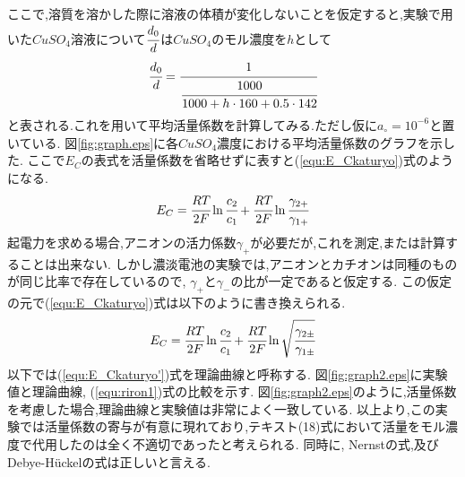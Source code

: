 ここで,溶質を溶かした際に溶液の体積が変化しないことを仮定すると,実験で用いた$CuSO_4$溶液について$\cfrac{d_0}{d}$は$CuSO_4$のモル濃度を$h$として
\begin{equation}
  \label{equ:h}
  \cfrac{d_0}{d}=\cfrac{1}{\cfrac{1000}{1000+h\cdot160+0.5\cdot142}}
\end{equation}
と表される.これを用いて平均活量係数を計算してみる.ただし仮に$a_{\circ}=10^{-6}$と置いている.
図\ref{fig:graph.eps}に各$CuSO_4$濃度における平均活量係数のグラフを示した.
ここで$E_C$の表式を活量係数を省略せずに表すと(\ref{equ:E_Ckaturyo})式のようになる.
\begin{equation}
  \label{equ:E_Ckaturyo}
  E_C=\cfrac{RT}{2F}\ln \cfrac{c_2}{c_1} + \cfrac{RT}{2F}\ln \cfrac{\gamma_{2+}}{\gamma_{1+}}
\end{equation}
起電力を求める場合,アニオンの活力係数$\gamma_+$が必要だが,これを測定,または計算することは出来ない\cite{kakiuchi2016}.
しかし濃淡電池の実験では,アニオンとカチオンは同種のものが同じ比率で存在しているので, $\gamma_{+}$と$\gamma_{-}$の比が一定であると仮定する.
この仮定の元で(\ref{equ:E_Ckaturyo})式は以下のように書き換えられる.
\begin{equation}
  \label{equ:E_Ckaturyo'}
  E_C=\cfrac{RT}{2F}\ln \cfrac{c_2}{c_1} + \cfrac{RT}{2F}\ln \sqrt{\cfrac{\gamma_{2\pm}}{\gamma_{1\pm}}}
\end{equation}
以下では(\ref{equ:E_Ckaturyo'})式を理論曲線と呼称する.
図\ref{fig:graph2.eps}に実験値と理論曲線, (\ref{equ:riron1})式の比較を示す.
図\ref{fig:graph2.eps}のように,活量係数を考慮した場合,理論曲線と実験値は非常によく一致している.
以上より,この実験では活量係数の寄与が有意に現れており,テキスト(18)式において活量をモル濃度で代用したのは全く不適切であったと考えられる.
同時に, Nernstの式,及びDebye-H\"{u}ckelの式は正しいと言える.
